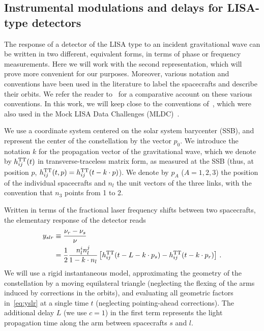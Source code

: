\documentclass[aps,showpacs,twocolumn,
prd,superscriptaddress,nofootinbib]{revtex4-1}
\newcommand{\nn}{\nonumber}
\newcommand{\hatk}{k}
\begin{document}
\subsection{Instrumental modulations and delays for LISA-type detectors}
\label{subsec:modulationLISA}

The response of a detector of the LISA type to an incident gravitational wave can be written in two different, equivalent forms, in terms of phase or frequency measurements. Here we will work with the second representation, which will prove more convenient for our purposes. Moreover, various notation and conventions have been used in the literature to label the spacecrafts and describe their orbits. We refer the reader to~\cite{Vallisneri04} for a comparative account on these various conventions. In this work, we will keep close to the conventions of~\cite{Vallisneri04}, which were also used in the Mock LISA Data Challenges (MLDC)~\cite{MLDC4}.

We use a coordinate system centered on the solar system barycenter (SSB), and represent the center of the constellation by the vector $p_{0}$. We introduce the notation $\hatk$ for the propagation vector of the gravitational wave, which we denote by $h_{ij}^{\rm TT}(t)$ in transverse-traceless matrix form, as measured at the SSB (thus, at position $p$, $h_{ij}^{\rm TT}(t, p) = h_{ij}^{\rm TT}(t - \hatk \cdot p)$). We denote by $p_{A}$ ($A=1,2,3$) the position of the individual spacecrafts and $n_{l}$ the unit vectors of the three links, with the convention that $n_{3}$ points from 1 to 2.

Written in terms of the fractional laser frequency shifts between two spacecrafts, the elementary response of the detector reads~\cite{EW75, RCP04, Vallisneri04}
\begin{align}\label{eq:yslr}
	y_{slr} &\equiv \frac{\nu_{r} - \nu_{s}}{\nu} \nn\\
	&= \frac{1}{2} \frac{n_{l}^{i}n_{l}^{j}}{1 - \hatk\cdot n_{l}} \left[ h_{ij}^{\rm TT}(t - L - \hatk\cdot p_{s}) - h_{ij}^{\rm TT}(t - \hatk\cdot p_{r}) \right] \,.
\end{align}
We will use a rigid instantaneous model, approximating the geometry of the constellation by a moving equilateral triangle (neglecting the flexing of the arms induced by corrections in the orbits), and evaluating all geometric factors in~\eqref{eq:yslr} at a single time $t$ (neglecting pointing-ahead corrections). The additional delay $L$ (we use $c=1$) in the first term represents the light propagation time along the arm between spacecrafts $s$ and $l$.
\end{document}
